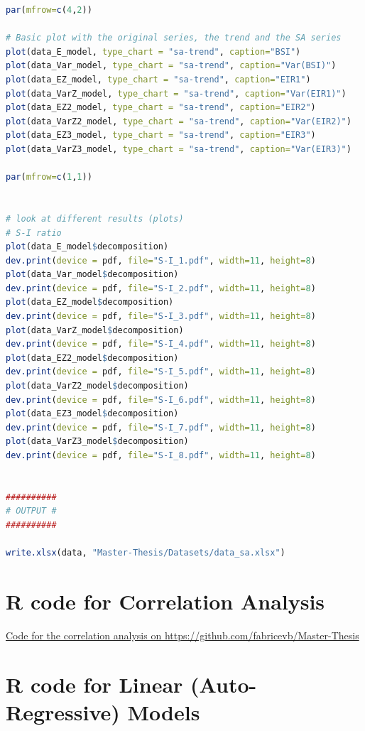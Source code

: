 \documentclass[12pt,a4paper,oneside]{book}
\begin{document}
\begin{lstlisting}[language=R]
par(mfrow=c(4,2))

# Basic plot with the original series, the trend and the SA series
plot(data_E_model, type_chart = "sa-trend", caption="BSI")
plot(data_Var_model, type_chart = "sa-trend", caption="Var(BSI)")
plot(data_EZ_model, type_chart = "sa-trend", caption="EIR1")
plot(data_VarZ_model, type_chart = "sa-trend", caption="Var(EIR1)")
plot(data_EZ2_model, type_chart = "sa-trend", caption="EIR2")
plot(data_VarZ2_model, type_chart = "sa-trend", caption="Var(EIR2)")
plot(data_EZ3_model, type_chart = "sa-trend", caption="EIR3")
plot(data_VarZ3_model, type_chart = "sa-trend", caption="Var(EIR3)")

par(mfrow=c(1,1))


# look at different results (plots)
# S-I ratio
plot(data_E_model$decomposition)
dev.print(device = pdf, file="S-I_1.pdf", width=11, height=8)
plot(data_Var_model$decomposition)
dev.print(device = pdf, file="S-I_2.pdf", width=11, height=8)
plot(data_EZ_model$decomposition)
dev.print(device = pdf, file="S-I_3.pdf", width=11, height=8)
plot(data_VarZ_model$decomposition)
dev.print(device = pdf, file="S-I_4.pdf", width=11, height=8)
plot(data_EZ2_model$decomposition)
dev.print(device = pdf, file="S-I_5.pdf", width=11, height=8)
plot(data_VarZ2_model$decomposition)
dev.print(device = pdf, file="S-I_6.pdf", width=11, height=8)
plot(data_EZ3_model$decomposition)
dev.print(device = pdf, file="S-I_7.pdf", width=11, height=8)
plot(data_VarZ3_model$decomposition)
dev.print(device = pdf, file="S-I_8.pdf", width=11, height=8)


##########
# OUTPUT #
##########

write.xlsx(data, "Master-Thesis/Datasets/data_sa.xlsx") 
\end{lstlisting}


\newpage
\section*{R code for Correlation Analysis}

\href{https://github.com/fabricevb/Master-Thesis/blob/master/R%20Code/Correlations.R}{Code for the correlation analysis on https://github.com/fabricevb/Master-Thesis}




\section*{R code for Linear (Auto-Regressive) Models}
\end{document}
